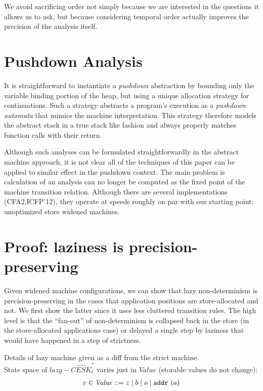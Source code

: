 \documentclass[preprint,onecolumn,9pt]{sigplanconf} %
\begin{document}
We avoid sacrificing order not simply because we are interested in the
questions it allows us to ask, but because considering temporal order actually
improves the precision of the analysis itself.



\section{Pushdown Analysis}

It is straightforward to instantiate a \emph{pushdown} abstraction by
bounding only the variable binding portion of the heap, but using a
unique allocation strategy for continuations.  Such a strategy
abstracts a program's execution as a \emph{pushdown automata}
that mimics the machine interpretation.  This strategy therefore
models the abstract stack in a true stack like fashion and always
properly matches function calls with their return.

Although such analyses can be formulated straightforwardly in the
abstract machine approach, it is not clear all of the techniques of
this paper can be applied to similar effect in the pushdown context.
The main problem is calculation of an analysis can no longer be
computed as the fixed point of the machine transition relation.
Although there are several implementations (CFA2,ICFP'12), they
operate at speeds roughly on par with our starting point: unoptimized
store widened
machines. \cite{dvanhorn:Earl2012Introspective,dvanhorn:Vardoulakis2011CFA2}

\appendix
\section{Proof: laziness is precision-preserving}
Given widened machine configurations, we can show that lazy
non-determinism is precision-preserving in the cases that application
positions are store-allocated and not. We first show the latter since
it uses less cluttered transition rules. The high level is that the
``fan-out'' of non-determinism is collapsed back in the store (in the
store-allocated applications case) or delayed a single step by
laziness that would have happened in a step of strictness.

Details of lazy machine given as a diff from the strict machine. \\
State space of $lazy-\widehat{CESK}^*_t$ varies just in
$\mathit{Value}$ (storable values do not change):
\begin{align*}
v \in \mathit{Value} &::= z \mid b \mid o \mid {\tt addr{\ }}({a}) \\
\end{align*}
\end{document}
